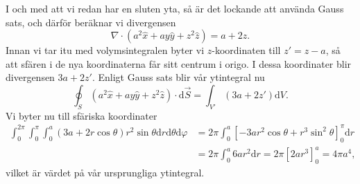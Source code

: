 \documentclass[%
oneside,                 %
final,                   %
10pt]{article}
\begin{document}
I och med att vi redan har en sluten yta, så är det lockande att använda Gauss sats, och därför beräknar vi divergensen
\begin{equation}
  \nabla \cdot \left(a^2 \hat{x} + ay \hat{y} + z^2 \hat{z}
\right) = a + 2z.
\end{equation}
Innan vi tar itu med volymsintegralen byter vi $z$-koordinaten till $z' = z -a$, så att sfären i de nya koordinaterna får sitt centrum i origo.  I dessa koordinater blir divergensen $3a +2z'$.  Enligt Gauss sats blir vår ytintegral nu
\begin{equation}
  \oint_S \left(a^2\hat{x} + ay \hat{y} + z^2 \hat{z}\right)
\cdot \mbox{d}\vec{S} = \int_{V'} \left(3a + 2z'\right) \mbox{d}V.
\end{equation}
Vi byter nu till sfäriska koordinater
\begin{align}
  \int_0^{2\pi} \int_0^\pi \int_0^a \left(3a + 2r\cos \theta\right) r^2
\sin \theta \mbox{d}r \mbox{d}\theta \mbox{d}\varphi &= 2\pi \int_0^a
\left[-3ar^2 \cos \theta + r^3 \sin^2 \theta \right]_0^\pi \mbox{d}r
\nonumber \\
&= 2\pi \int_0^a 6ar^2 \mbox{d}r = 2 \pi \left[2ar^3\right]_0^a = 4\pi a^4,
\end{align}
vilket är värdet på vår ursprungliga ytintegral.




\printindex
\end{document}
